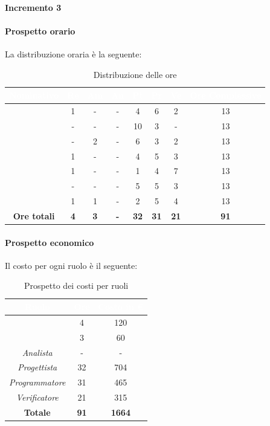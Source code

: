 \paragraph{Incremento 3}
\paragraph*{Prospetto orario}
La distribuzione oraria è la seguente:
\begin{table}[H]
	\begin{center}
		\begin{tabular}{ |c c c c c c c c| }
		\rowcolor{darkblue} 
		\textcolor{white}{\textbf{Nominativo}} & \textcolor{white}{\textbf{Re}} & \textcolor{white}{\textbf{Am}} & \textcolor{white}{\textbf{An}} & \textcolor{white}{\textbf{Pt}} & \textcolor{white}{\textbf{Pr}} & \textcolor{white}{\textbf{Ve}} & \textcolor{white}{\textbf{Ore Complessive}} \\ \hline
		\BL 	& 1  	& -  	& - 	& 4 	& 6 	& 2 	& 13 \\ \hline
		\FF 	& -  	& -  	& - 	& 10 	& 3 	& -  	& 13 \\ \hline
		\MM 	& -  	& 2  	& - 	& 6 	& 3 	& 2 	& 13 \\ \hline
		\PC 	& 1 	& -  	& - 	& 4 	& 5 	& 3 	& 13 \\ \hline
		\TG 	& 1  	& -		& - 	& 1 	& 4 	& 7 	& 13 \\ \hline
		\TL 	& -  	& - 	& - 	& 5 	& 5 	& 3 	& 13 \\ \hline
		\VD 	& 1  	& 1  	& - 	& 2 	& 5 	& 4 	& 13 \\ \hline
		\textbf{Ore totali} & \textbf{4} & \textbf{3} & \textbf{-} & \textbf{32} & \textbf{31} & \textbf{21} & \textbf{91} \\ \hline
		\end{tabular}
		\caption{Distribuzione delle ore}
	\end{center}
\end{table}
\paragraph*{Prospetto economico}
Il costo per ogni ruolo è il seguente:
\begin{table}[H]
	\begin{center}
		\begin{tabular}{ |c c c| }
			\rowcolor{darkblue} 
			\textcolor{white}{\textbf{Ruolo}} & \textcolor{white}{\textbf{Ore}} & \textcolor{white}{\textbf{Costo in €}}\\ \hline
		{\Responsabile} 			& 4 	& 120 \\ \hline
		{\Amministratore}		 	& 3 	& 60 \\ \hline
		\textit{Analista} 			& - 	& - \\ \hline
		\textit{Progettista} 		& 32 	& 704 \\ \hline
		\textit{Programmatore}  	& 31 	& 465 \\ \hline
		\textit{Verificatore} 		& 21 	& 315 \\ \hline
		\textbf{Totale} & \textbf{91} & \textbf{1664} \\ \hline
		\end{tabular}
		\caption{Prospetto dei costi per ruoli}
	\end{center}
\end{table}
